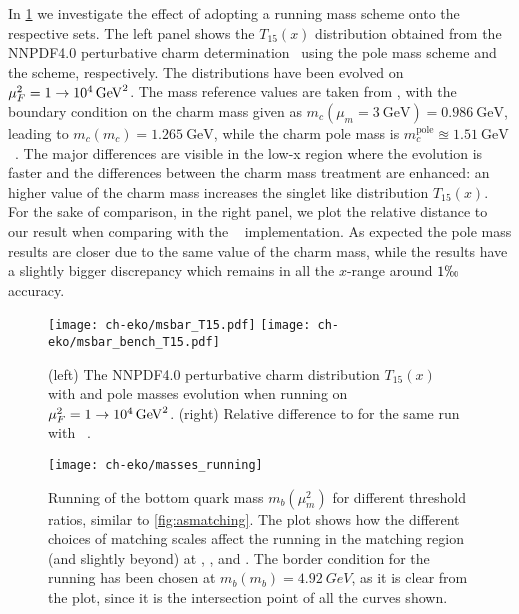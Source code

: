 In \cref{fig:MSbarbench} we investigate the effect of adopting a running mass
scheme onto the respective \pdf{} sets. The left panel shows the $T_{15}(x)$
distribution obtained from the NNPDF4.0 perturbative charm
determination~\cite{NNPDF:2021njg} using the pole mass scheme and the \msbar{}
scheme, respectively.
The distributions have been evolved on $\muF^2=\SI[parse-numbers=false]{1\to
10^4}{\GeV^2}$.
The mass reference values are taken from
\cite{LHCHiggsCrossSectionWorkingGroup:2016ypw}, with the \msbar{}
boundary condition on the charm mass given as $m_c(\mu_m=\SI{3}{\GeV}) =
\SI{0.986}{\GeV}$, leading to $m_c(m_c) = \SI{1.265}{\GeV}$, while the charm
pole mass is $m^\text{pole}_{c}\approxeq\SI{1.51}{\GeV}$~\cite{NNPDF:2021njg}.
The major differences are visible in the low-x region where the \dglap{}
evolution is faster and the differences between the charm mass treatment are
enhanced: an higher value of the charm mass increases the singlet like
distribution $T_{15}(x)$.
For the sake of comparison, in the right panel, we plot the relative distance
to our result when comparing with the \apfel{}~\cite{Bertone:2013vaa}
implementation.
As expected the pole mass results are closer due to the same value of the charm
mass, while the \msbar{} results have a slightly bigger discrepancy which
remains in all the $x$-range around $1\permil$ accuracy.

\begin{figure}
    \centering
    \texttt{[image: ch-eko/msbar\_T15.pdf]}
    \texttt{[image: ch-eko/msbar\_bench\_T15.pdf]}
    \caption{(left) The NNPDF4.0 perturbative charm distribution
        $T_{15}(x)$~\cite{NNPDF:2021njg} with \msbar{} and pole masses \nnlo{}
        evolution when running on $\muF^2=\SI[parse-numbers=false]{1\to
        10^4}{\GeV^2}$.  (right) Relative difference to \eko{} for the same run
        with \apfel{}~\cite{Bertone:2013vaa}.}
     \label{fig:MSbarbench}
\end{figure}

\begin{figure}
    \centering
    \texttt{[image: ch-eko/masses\_running]}
    \caption{Running of the bottom quark mass $m_b(\mu_m^2)$ for different threshold
        ratios, similar to \cref{fig:asmatching}.
        The plot shows how the different choices of matching scales affect the
        running in the matching region (and slightly beyond) at \lo{}, \nlo{},
        and \nnlo{}.
        The border condition for the running has been chosen at $m_b(m_b) =
        \SI{4.92}{GeV}$, as it is clear from the plot, since it is the
        intersection point of all the curves shown.}
    \label{fig:runningmasses}
\end{figure}


